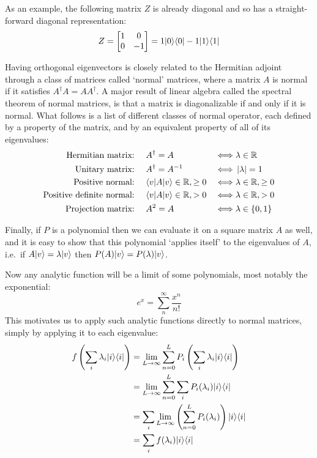 As an example, the following matrix $Z$ is already diagonal and so has a straight-forward diagonal representation:
\begin{align*}
	Z = \left[\begin{matrix}
		1&0\\
		0&-1
	\end{matrix}\right] = 1| 0 \rangle\langle 0 | - 1| 1 \rangle\langle 1 |
\end{align*}

Having orthogonal eigenvectors is closely related to the Hermitian adjoint through a class of matrices called `normal' matrices, where a matrix $A$ is normal if it satisfies $A^\dagger A = AA^\dagger$. A major result of linear algebra called the spectral theorem of normal matrices, is that a matrix is diagonalizable if and only if it is normal. What follows is a list of different classes of normal operator, each defined by a property of the matrix, and by an equivalent property of all of its eigenvalues:
\begin{align*}
	\text{Hermitian matrix:\ }&&& A^\dagger = A & \iff& \lambda \in \mathbb{R} \\
	\text{Unitary matrix:\ }&&& A^\dagger = A^{-1} & \iff& \left| \lambda \right|=1 \\
	\text{Positive normal:\ }&&& \langle v |A| v \rangle \in \mathbb{R}, \geq 0 & \iff& \lambda \in \mathbb{R}, \geq 0 \\
	\text{Positive definite normal:\ }&&& \langle v |A| v \rangle \in \mathbb{R}, > 0 & \iff& \lambda \in \mathbb{R}, > 0 \\
	\text{Projection matrix:\ }&&& A^2 = A & \iff& \lambda \in \{0, 1\} \\
\end{align*}

Finally, if $P$ is a polynomial then we can evaluate it on a square matrix $A$ as well, and it is easy to show that this polynomial `applies itself' to the eigenvalues of $A$, i.e.\ if $A| v \rangle = \lambda| v \rangle$ then $P(A)| v \rangle = P(\lambda)| v \rangle$.

Now any analytic function will be a limit of some polynomials, most notably the exponential:
\[e^x = \sum_n^\infty \frac{x^n}{n!}\]
This motivates us to apply such analytic functions directly to normal matrices, simply by applying it to each eigenvalue:
\begin{align*}
f\left(\sum_i \lambda_i| i \rangle\langle i |\right)
&= \lim_{L \to \infty} \sum_{n=0}^L P_i\left(\sum_i \lambda_i| i \rangle\langle i |\right)
\\&= \lim_{L \to \infty} \sum_{n=0}^L \sum_i P_i(\lambda_i)| i \rangle\langle i |
\\&= \sum_i \lim_{L \to \infty} \left(\sum_{n=0}^L  P_i(\lambda_i)\right)| i \rangle\langle i |
\\&= \sum_i f(\lambda_i)| i \rangle\langle i |
\end{align*}

